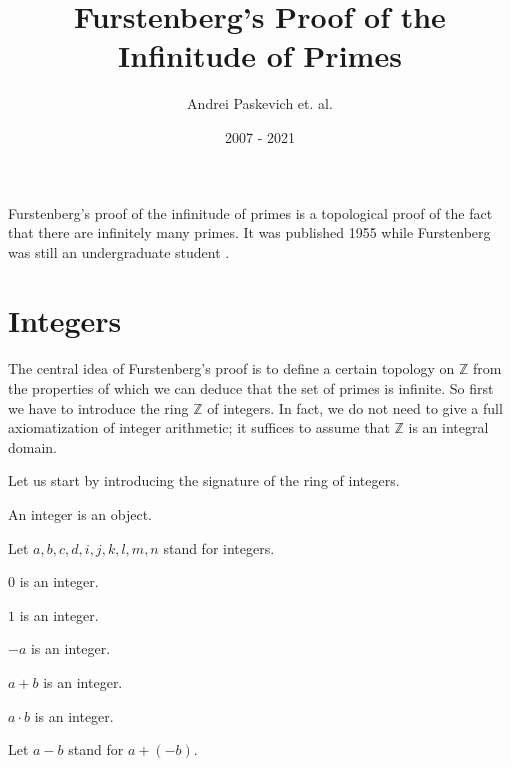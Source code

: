 \documentclass[english]{article}
\title{Furstenberg's Proof of the Infinitude of Primes}
\author{Andrei Paskevich et. al.}
\date{2007 - 2021}
\newcommand{\Int}{\mathbb{Z}}
\begin{document}
  \maketitle

  Furstenberg's proof of the infinitude of primes is a topological proof of the fact that there are
  infinitely many primes. It was published 1955 while Furstenberg was still an undergraduate
  student \cite{Furstenberg1955}.

  \section{Integers}

  The central idea of Furstenberg's proof is to define a certain topology on $\Int$ from the
  properties of which we can deduce that the set of primes is infinite. So first we have to
  introduce the ring $\Int$ of integers. In fact, we do not need to give a full axiomatization of
  integer arithmetic; it suffices to assume that $\Int$ is an integral domain.

  Let us start by introducing the signature of the ring of integers.

  \begin{forthel}

    \begin{signature}\label{Integers}
      An integer is an object.
    \end{signature}

    Let $a,b,c,d,i,j,k,l,m,n$ stand for integers.

    \begin{signature}\label{IntZero}
      $0$ is an integer.
    \end{signature}

    \begin{signature}\label{IntOne}
      $1$ is an integer.
    \end{signature}

    \begin{signature}\label{IntNeg}
      $-a$ is an integer.
    \end{signature}

    \begin{signature}\label{IntPlus}
      $a + b$ is an integer.
    \end{signature}

    \begin{signature}\label{IntMult}
      $a \cdot b$ is an integer.
    \end{signature}

    Let $a - b$ stand for $a + (-b)$.
  \end{forthel}
\end{document}
